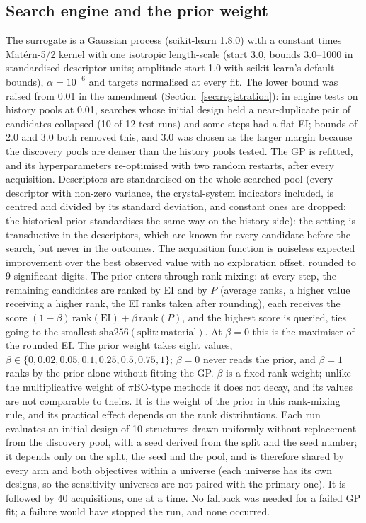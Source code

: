 \subsection{Search engine and the prior weight}\label{sec:engine}
The surrogate is a Gaussian process\cite{rasmussen2006gpml} (scikit-learn 1.8.0\cite{pedregosa2011sklearn}) with a constant
times Mat\'ern-5/2 kernel with one isotropic length-scale (start 3.0, bounds 3.0--1000 in standardised descriptor units; amplitude
start 1.0 with scikit-learn's default bounds), $\alpha=10^{-6}$ and targets normalised at every fit. The lower bound was raised from 0.01 in the amendment
(Section~\ref{sec:registration}): in engine tests on history pools at 0.01, searches whose initial design held a near-duplicate
pair of candidates collapsed (10 of 12 test runs) and some steps had a flat EI; bounds of 2.0 and 3.0 both removed this, and 3.0
was chosen as the larger margin because the discovery pools are denser than the history pools tested. The GP is refitted, and its
hyperparameters re-optimised with two random restarts, after every acquisition. Descriptors are standardised on the whole searched
pool (every descriptor with non-zero variance, the crystal-system indicators included, is centred and divided by its standard
deviation, and constant ones are dropped; the historical prior standardises the same way on the history side): the setting is transductive in the descriptors, which are known for every candidate before the search, but never in the
outcomes. The acquisition function is noiseless expected improvement over the best observed value with no exploration
offset\cite{jones1998ego}, rounded to 9 significant digits. The prior enters through rank mixing: at every step, the remaining
candidates are ranked by EI and by $P$ (average ranks, a higher value receiving a higher rank, the EI ranks taken after rounding),
each receives the score $(1-\beta)\,\mathrm{rank}(\mathrm{EI})+\beta\,\mathrm{rank}(P)$, and the highest score is queried, ties going
to the smallest $\mathrm{sha256}(\text{split}{:}\text{material})$. At $\beta=0$ this is the maximiser of the rounded EI. The prior weight
takes eight values, $\beta\in\{0,0.02,0.05,0.1,0.25,0.5,0.75,1\}$; $\beta=0$ never reads the prior, and $\beta=1$ ranks by the prior
alone without fitting the GP. $\beta$ is a fixed rank weight; unlike the multiplicative weight of
$\pi$BO-type methods\cite{hvarfner2022pibo} it does not decay, and its values are not comparable to theirs. It is the weight of the prior in this rank-mixing rule, and its practical effect depends on
the rank distributions. Each run evaluates an initial design of 10 structures drawn uniformly without replacement from the discovery
pool, with a seed derived from the split and the seed number; it depends only on the split, the seed and the pool, and is therefore
shared by every arm and both objectives within a universe (each universe has its own designs, so the sensitivity universes are not
paired with the primary one). It is followed by 40 acquisitions, one at a time. No fallback was needed for a failed GP fit; a failure
would have stopped the run, and none occurred.

